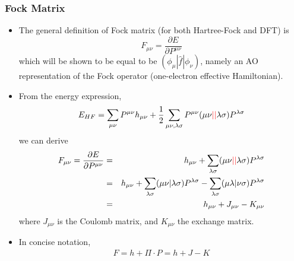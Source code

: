 \documentclass[handout]{beamer} %
\begin{document}
\begin{frame}
\frametitle{\normalsize Fock Matrix}
\vspace{-3mm}
\begin{itemize}
\item \footnotesize{The general definition of Fock matrix (for both Hartree-Fock and DFT) is}
\begin{equation*}
F_{\mu \nu} = \frac {\partial  E} {\partial P^{\mu \nu}}   
\end{equation*}
which will be shown to be equal to be $ ( \phi_{\mu} |  \hat{f} | \phi_{\nu} )$, namely an AO representation of the Fock operator (one-electron effective Hamiltonian).   
\item From the energy expression, 
\begin{eqnarray*}
E_{HF} =  \sum_{\mu \nu}   P^{\mu \nu}  h_{\mu\nu} + \frac{1}{2} \sum_{\mu \nu, \lambda \sigma} P^{\mu \nu} ( \mu \nu \textcolor{red}{||} \lambda \sigma ) P^{\lambda \sigma} 
\end{eqnarray*}
we can derive
\begin{eqnarray*}
F_{\mu \nu} = \frac {\partial  E} {\partial P^{\mu \nu}}    & = &   h_{\mu \nu} + \sum_{ \lambda \sigma} ( \mu \nu \textcolor{red}{||} \lambda \sigma ) P^{\lambda \sigma}   \\
& = & h_{\mu \nu} + \sum_{ \lambda \sigma} ( \mu \nu | \lambda \sigma ) P^{\lambda \sigma}   -  \sum_{ \lambda \sigma} ( \mu \lambda | \nu \sigma ) P^{\lambda \sigma}  \\
& = &  h_{\mu \nu}  +  J_{\mu \nu}  - K_{\mu \nu}   
\end{eqnarray*} 
where $J_{\mu \nu}$ is the Coulomb matrix, and $K_{\mu \nu}$ the exchange matrix.  
\item In concise notation, 
\begin{eqnarray*}
F = h + \Pi \cdot P = h + J - K 
\end{eqnarray*} 
\end{itemize}
\end{frame}
\end{document}
